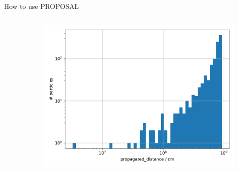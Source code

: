 \documentclass[t]{beamer}
\begin{document}
\begin{columns}[onlytextwidth]
\begin{column}{0.6\textwidth}
\begin{block}{How to use PROPOSAL}
\begin{columns}[onlytextwidth]
\begin{column}{0.45\textwidth}
          \end{column}
          \begin{column}{0.1\textwidth}
          \begin{center}
            \vspace{7em}
          \end{center}          
        \end{column}
          \begin{column}{0.45\textwidth}
            \begin{figure}
              \includegraphics[width=\linewidth, height=.4\textheight, keepaspectratio]{plots/example_output.pdf}
            \end{figure}
          \end{column}
        \end{columns}


\end{block}
\end{column}
\end{columns}
\end{document}
